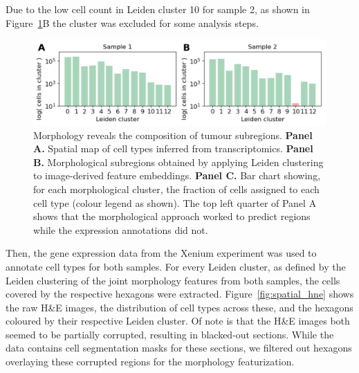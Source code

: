 \documentclass{article}
\begin{document}
Due to the low cell count in Leiden cluster 10 for sample 2, as shown in Figure~\ref{fig:spatial_c10}B the cluster was excluded for some analysis steps.

\begin{figure}[htbp]
\centering
\includegraphics[width=.7\linewidth]{./figs/fig_S4_spatial_c10.png}
\caption{\label{fig:spatial_c10}{}Morphology reveals the composition of tumour subregions. \textbf{Panel A.} Spatial map of cell types inferred from transcriptomics. \textbf{Panel B.} Morphological subregions obtained by applying Leiden clustering to image-derived feature embeddings. \textbf{Panel C.} Bar chart showing, for each morphological cluster, the fraction of cells assigned to each cell type (colour legend as shown). The top left quarter of Panel A shows that the morphological approach worked to predict regions while the expression annotations did not.}
\end{figure}

\newpage

Then, the gene expression data from the Xenium experiment was used to annotate cell types for both samples. For every Leiden cluster, as defined by the Leiden clustering of the joint morphology features from both samples, the cells covered by the respective hexagons were extracted. Figure~\ref{fig:spatial_hne} shows the raw H\&E images, the distribution of cell types across these, and the hexagons coloured by their respective Leiden cluster. Of note is that the H\&E images both seemed to be partially corrupted, resulting in blacked-out sections. While the data contains cell segmentation masks for these sections, we filtered out hexagons overlaying these corrupted regions for the morphology featurization.
\end{document}
